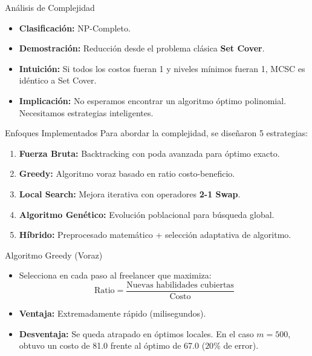 \documentclass[10pt]{beamer}
\begin{document}
\begin{frame}{Análisis de Complejidad}
    \begin{itemize}
        \item \textbf{Clasificación:} NP-Completo.
        \item \textbf{Demostración:} Reducción desde el problema clásica \textbf{Set Cover}.
        \item \textbf{Intuición:} Si todos los costos fueran 1 y niveles mínimos fueran 1, MCSC es idéntico a Set Cover.
        \item \textbf{Implicación:} No esperamos encontrar un algoritmo óptimo polinomial. Necesitamos estrategias inteligentes.
    \end{itemize}
\end{frame}

\begin{frame}{Enfoques Implementados}
    Para abordar la complejidad, se diseñaron 5 estrategias:
    \begin{enumerate}
        \item \textbf{Fuerza Bruta:} Backtracking con poda avanzada para óptimo exacto.
        \item \textbf{Greedy:} Algoritmo voraz basado en ratio costo-beneficio.
        \item \textbf{Local Search:} Mejora iterativa con operadores \textbf{2-1 Swap}.
        \item \textbf{Algoritmo Genético:} Evolución poblacional para búsqueda global.
        \item \textbf{Híbrido:} Preprocesado matemático + selección adaptativa de algoritmo.
    \end{enumerate}
\end{frame}

\begin{frame}{Algoritmo Greedy (Voraz)}
    \begin{itemize}
        \item Selecciona en cada paso al freelancer que maximiza:
        \[ \text{Ratio} = \frac{\text{Nuevas habilidades cubiertas}}{\text{Costo}} \]
        \item \textbf{Ventaja:} Extremadamente rápido (milisegundos).
        \item \textbf{Desventaja:} Se queda atrapado en óptimos locales. En el caso $m=500$, obtuvo un costo de 81.0 frente al óptimo de 67.0 ($20\%$ de error).
    \end{itemize}
\end{frame}
\end{document}

